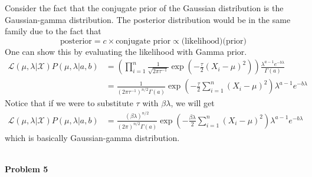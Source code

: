 \documentclass{article}
\begin{document}
\color{blue}
\begin{sol}
    Consider the fact that the conjugate prior of the Gaussian distribution is the Gaussian-gamma distribution. The posterior distribution would be in the same family due to the fact that
    $$\text{posterior} = c\times\text{conjugate prior} \propto \text{(likelihood)(prior)}$$
    One can show this by evaluating the likelihood with Gamma prior.
    \begin{align*}
    \mathcal{L}(\mu,\lambda|\mathcal{X})P(\mu,\lambda|a,b) &= \left(\prod_{i=1}^n \frac{1}{\sqrt{2\pi\tau^{-1}}} \exp\left(-\frac{\tau}{2}(X_i-\mu)^2\right)\right)\frac{\lambda^{a-1}e^{-b\lambda}}{\Gamma(a)}\\
    &= \frac{1}{(2\pi\tau^{-1})^{n/2}\Gamma(a)} \exp\left(-\frac{\tau}{2}\sum_{i=1}^n(X_i-\mu)^2\right)\lambda^{a-1}e^{-b\lambda}
    \end{align*}
    Notice that if we were to substitute $\tau$ with $\beta\lambda$, we will get
    \begin{align*}
    \mathcal{L}(\mu,\lambda|\mathcal{X})P(\mu,\lambda|a,b) &= \frac{(\beta\lambda)^{n/2}}{(2\pi)^{n/2}\Gamma(a)} \exp\left(-\frac{\beta\lambda}{2}\sum_{i=1}^n(X_i-\mu)^2\right)\lambda^{a-1}e^{-b\lambda}
    \end{align*}
    which is basically Gaussian-gamma distribution. 
\end{sol}
\color{black}
\leavevmode\\
\newpage
{}
\noindent
\Large{\textbf{Problem 5}}\normalsize
\\
\end{document}
